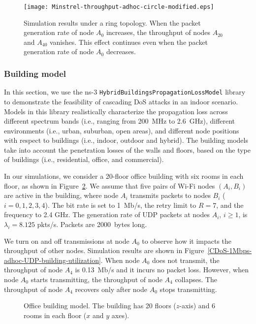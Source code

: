 \documentclass{IEEEtran}
\begin{document}
\begin{figure}[!t]
\centering
\texttt{[image: Minstrel-throughput-adhoc-circle-modified.eps]}
\caption{Simulation results under a ring topology. When the packet generation rate of node
  $A_0$ increases, the throughput of nodes $A_{20}$ and $A_{40}$
  vanishes. This effect continues even when the packet generation rate of node $A_0$ decreases.}
\label{Simulation Result with Minstrel Rate Adaptation circle}
\end{figure}


\subsubsection{Building model} \label{Building model}
In this section, we use the ns-3  {\tt HybridBuildingsPropagationLossModel} library~\cite{ns3hybridbuildingspropagationlossmodel} to demonstrate the feasibility of cascading DoS attacks in an indoor scenario. Models in this library realistically characterize the propagation loss across different spectrum bands (i.e., ranging from 200~MHz to 2.6~GHz), different environments (i.e., urban, suburban, open areas), and different node positions with respect to buildings (i.e., indoor, outdoor and hybrid). The building models take into account the penetration losses of the walls and floors, based on the type of buildings (i.e., residential, office, and commercial).


In our simulations, we consider a 20-floor office building with six rooms in each floor, as shown in Figure~\ref{building_model}.  We assume that five pairs of Wi-Fi nodes $(A_i, B_i)$ are active in the building, where node $A_i$ transmits packets to nodes $B_i$ ($i=0,1,2,3,4$). The bit rate is set to 1~Mb/s, the retry limit to $R=7$, and the frequency to 2.4 GHz.  The generation rate of UDP packets at nodes $A_i$, $i \geq 1$,  is $\lambda_i = 8.125$ pkts/s.  Packets are 2000~bytes long.




We turn on and off transmissions at node $A_0$ to observe how it impacts the throughput of other nodes. Simulation results are shown in Figure~\ref{CDoS-1Mbps-adhoc-UDP-building-utilization}. When node $A_0$ does not transmit, the throughput of node $A_4$ is 0.13~Mb/s and it incurs no packet loss. However, when node $A_0$ starts transmitting, the throughput of node $A_4$ collapses. The throughput of node $A_4$ recovers only after node $A_0$ stops transmitting.


\begin{figure}[!t]
\centering
{}
\vfil
{}
\caption{Office building model. The building has 20 floors ($z$-axis) and 6 rooms in each floor ($x$ and $y$ axes).}
\label{building_model}
\end{figure}
\end{document}
